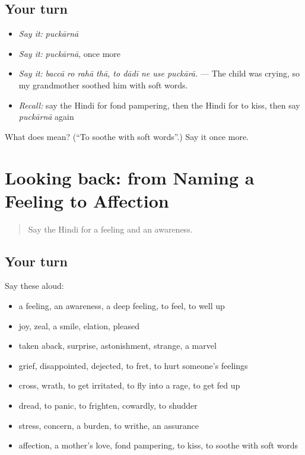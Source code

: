 \subsection*{Your turn}
\begin{itemize}
\raggedright
  \item \emph{Say it:} \emph{puckārnā}
  \item \emph{Say it:} \emph{puckārnā}, once more
  \item \emph{Say it:} \emph{baccā ro rahā thā, to dādī ne use puckārā.} — The child was crying, so my grandmother soothed him with soft words.
  \item \emph{Recall:} say the Hindi for fond pampering, then the Hindi for to kiss, then say \emph{puckārnā} again
\end{itemize}

\begin{tcolorbox}[breakable,colback=teal!4,colframe=teal!35!black,title={Before you move on}]
What does  mean? (\textquotedblleft{}To soothe with soft words\textquotedblright{}.) Say it once more.
\end{tcolorbox}
\section[(dialogue)]{Looking back: from Naming a Feeling to Affection}

\label{lesson:HI-R459-review-452-459}



\begin{quote}
Say the Hindi for a feeling and an awareness.
\end{quote}

\subsection*{Your turn}
Say these aloud:

\begin{itemize}
\raggedright
  \item a feeling, an awareness, a deep feeling, to feel, to well up
  \item joy, zeal, a smile, elation, pleased
  \item taken aback, surprise, astonishment, strange, a marvel
  \item grief, disappointed, dejected, to fret, to hurt someone's feelings
  \item cross, wrath, to get irritated, to fly into a rage, to get fed up
  \item dread, to panic, to frighten, cowardly, to shudder
  \item stress, concern, a burden, to writhe, an assurance
  \item affection, a mother's love, fond pampering, to kiss, to soothe with soft words
\end{itemize}

